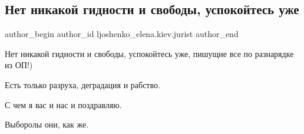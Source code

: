  
 
 
 
 
 
\subsection{Нет никакой гидности и свободы, успокойтесь уже}
\label{sec:21_11_2021.fb.ljoshenko_elena.kiev.jurist.1.gidnist_svoboda_netu}
 
\ifcmt
 author_begin
   author_id ljoshenko_elena.kiev.jurist
 author_end
\fi

Нет никакой гидности и свободы, успокойтесь уже, пишущие все по разнарядке из
ОП!) 

Есть только разруха, деградация и рабство. 

С чем я вас и нас и поздравляю. 

Выборолы они, как же.

